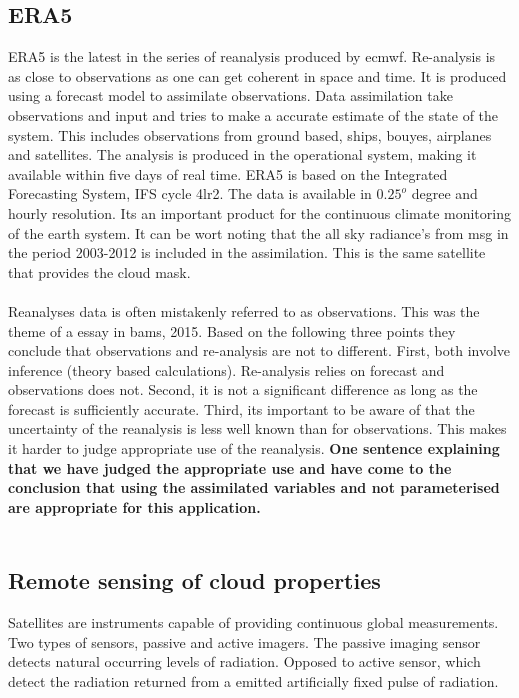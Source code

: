 \subsection{ERA5} \label{sec:era5}
ERA5 is the latest in the series of reanalysis produced by \acrfull{ecmwf}. Re-analysis is as close to observations as one can get coherent in space and time. It is produced using a forecast model to assimilate observations. Data assimilation take observations and input and tries to make a accurate estimate of the state of the system. This includes observations from ground based, ships, bouyes, airplanes and satellites. The analysis is produced in the operational system, making it available within five days of real time. ERA5 is based on the Integrated Forecasting System, IFS cycle 4lr2. The data is available in $0.25^o$ degree and hourly resolution. Its an important product for the continuous climate monitoring of the earth system. It can be wort noting that the all sky radiance's from \acrfull{msg} in the period 2003-2012 is included in the assimilation. This is the same satellite that provides the cloud mask. 
\\ \\ 
Reanalyses data is often mistakenly referred to as observations. This was the theme of a essay in \acrfull{bams}, 2015. Based on the following three points they conclude that observations and re-analysis are not to different. First, both involve inference (theory based calculations). Re-analysis relies on forecast and observations does not. Second, it is not a significant difference as long as the forecast is sufficiently accurate. Third, its important to be aware of that the uncertainty of the reanalysis is less well known than for observations. This makes it harder to judge appropriate use of the reanalysis. 
\textbf{One sentence explaining that we have judged the appropriate use and have come to the conclusion that using the assimilated variables and not parameterised are appropriate for this application.}
\\ \\
\subsection{Remote sensing of cloud properties}
Satellites are instruments capable of providing continuous global measurements. Two types of sensors, passive and active imagers. The passive imaging sensor detects natural occurring levels of radiation. Opposed to active sensor, which detect the radiation returned from a emitted artificially fixed pulse of radiation.

